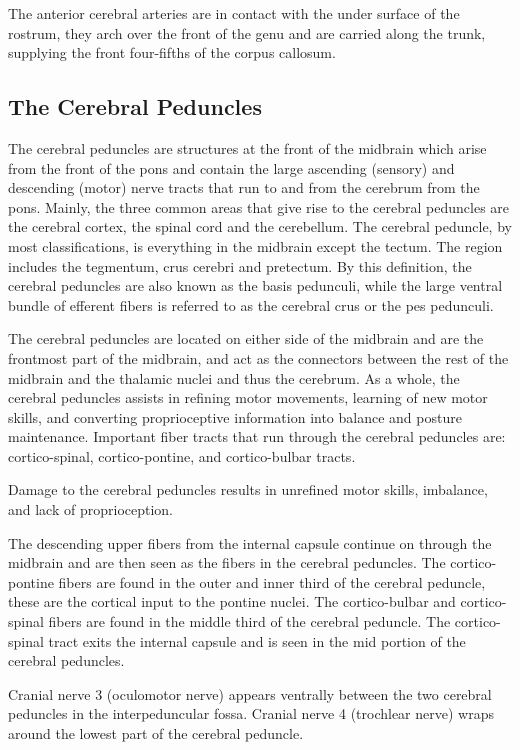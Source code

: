 \documentclass[]{book}
\begin{document}
The anterior cerebral arteries are in contact with the under surface of the rostrum, they arch over the front of the genu and are carried along the trunk, supplying the front four-fifths of the corpus callosum.

\hypertarget{the-cerebral-peduncles}{%
\subsection{The Cerebral Peduncles}\label{the-cerebral-peduncles}}

The cerebral peduncles are structures at the front of the midbrain which arise from the front of the pons and contain the large ascending (sensory) and descending (motor) nerve tracts that run to and from the cerebrum from the pons. Mainly, the three common areas that give rise to the cerebral peduncles are the cerebral cortex, the spinal cord and the cerebellum. The cerebral peduncle, by most classifications, is everything in the midbrain except the tectum. The region includes the tegmentum, crus cerebri and pretectum. By this definition, the cerebral peduncles are also known as the basis pedunculi, while the large ventral bundle of efferent fibers is referred to as the cerebral crus or the pes pedunculi.

The cerebral peduncles are located on either side of the midbrain and are the frontmost part of the midbrain, and act as the connectors between the rest of the midbrain and the thalamic nuclei and thus the cerebrum. As a whole, the cerebral peduncles assists in refining motor movements, learning of new motor skills, and converting proprioceptive information into balance and posture maintenance. Important fiber tracts that run through the cerebral peduncles are: cortico-spinal, cortico-pontine, and cortico-bulbar tracts.

Damage to the cerebral peduncles results in unrefined motor skills, imbalance, and lack of proprioception.

The descending upper fibers from the internal capsule continue on through the midbrain and are then seen as the fibers in the cerebral peduncles. The cortico-pontine fibers are found in the outer and inner third of the cerebral peduncle, these are the cortical input to the pontine nuclei. The cortico-bulbar and cortico-spinal fibers are found in the middle third of the cerebral peduncle. The cortico-spinal tract exits the internal capsule and is seen in the mid portion of the cerebral peduncles.

Cranial nerve 3 (oculomotor nerve) appears ventrally between the two cerebral peduncles in the interpeduncular fossa. Cranial nerve 4 (trochlear nerve) wraps around the lowest part of the cerebral peduncle.
\end{document}
